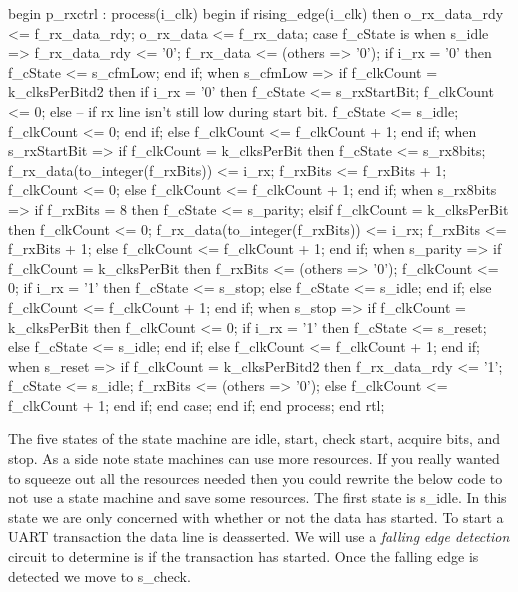 \begin{VHDLlisting}[tabsize=8]
begin
  p_rxctrl : process(i_clk) 
  begin
    if rising_edge(i_clk) then
      o_rx_data_rdy <= f_rx_data_rdy;
      o_rx_data <= f_rx_data;
      case f_cState is
        when s_idle => 
          f_rx_data_rdy <= '0';
          f_rx_data <= (others => '0');
          if i_rx = '0' then
            f_cState <= s_cfmLow;
          end if;
        when s_cfmLow =>
          if f_clkCount = k_clksPerBitd2 then
            if i_rx = '0' then
              f_cState <= s_rxStartBit;
              f_clkCount <= 0;  
            else 
              -- if rx line isn't still low during start bit.
              f_cState <= s_idle;
              f_clkCount <= 0;
            end if;
          else
            f_clkCount <= f_clkCount + 1;
          end if;
        when s_rxStartBit =>
          if f_clkCount = k_clksPerBit then
            f_cState <= s_rx8bits;
            f_rx_data(to_integer(f_rxBits)) <= i_rx;
            f_rxBits <= f_rxBits + 1;
            f_clkCount <= 0;
          else 
            f_clkCount <= f_clkCount + 1;
          end if;        
        when s_rx8bits =>
          if f_rxBits = 8 then
            f_cState <= s_parity;
          elsif f_clkCount = k_clksPerBit then 
            f_clkCount <= 0;
            f_rx_data(to_integer(f_rxBits)) <= i_rx;
            f_rxBits <= f_rxBits + 1;
          else 
            f_clkCount <= f_clkCount + 1;
          end if;
        when s_parity =>
          if f_clkCount = k_clksPerBit then
            f_rxBits <= (others => '0');
            f_clkCount <= 0;
            if i_rx = '1' then
              f_cState <= s_stop;
            else
              f_cState <= s_idle;
            end if;
          else
            f_clkCount <= f_clkCount + 1;
          end if;
        when s_stop => 
          if f_clkCount = k_clksPerBit then
            f_clkCount <= 0;
            if i_rx = '1' then
              f_cState <= s_reset;
            else
              f_cState <= s_idle;
            end if;
          else
            f_clkCount <= f_clkCount + 1;
          end if;
        when s_reset =>
          if f_clkCount = k_clksPerBitd2 then
            f_rx_data_rdy <= '1';
            f_cState <= s_idle;
            f_rxBits <= (others => '0');
          else
            f_clkCount <= f_clkCount + 1;
          end if;
      end case; 
    end if;
  end process;
end rtl;
\end{VHDLlisting}

The five states of the state machine are idle, start, check start, acquire bits, and stop. As a side note state machines can use more resources. If you really wanted to squeeze out all the resources needed then you could rewrite the below code to not use a state machine and save some resources. The first state is s\_idle. In this state we are only concerned with whether or not the data has started. To start a \ac{UART} transaction the data line is deasserted. We will use a \emph{falling edge detection} circuit to determine is if the transaction has started. Once the falling edge is detected we move to s\_check.

